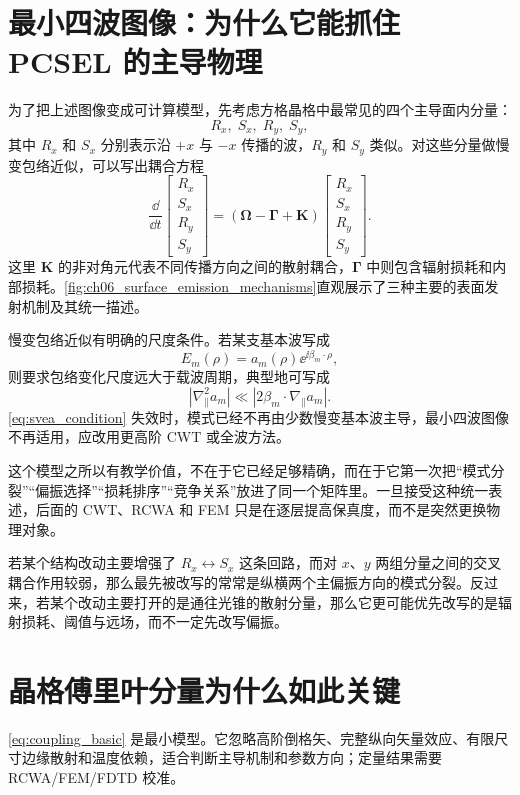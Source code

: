\section{最小四波图像：为什么它能抓住 PCSEL 的主导物理}
为了把上述图像变成可计算模型，先考虑方格晶格中最常见的四个主导面内分量：
\[
R_x,\; S_x,\; R_y,\; S_y,
\]
其中 $R_x$ 和 $S_x$ 分别表示沿 $+x$ 与 $-x$ 传播的波，$R_y$ 和 $S_y$ 类似。对这些分量做慢变包络近似，可以写出耦合方程
\begin{equation}
\frac{\dd}{\dd t}
\begin{bmatrix}
R_x\\S_x\\R_y\\S_y
\end{bmatrix}
=
\left(
\bm{\Omega}
-
\bm{\Gamma}
+
\mathbf{K}
\right)
\begin{bmatrix}
R_x\\S_x\\R_y\\S_y
\end{bmatrix}.
\label{eq:coupling_basic}
\end{equation}
这里 $\mathbf{K}$ 的非对角元代表不同传播方向之间的散射耦合，$\bm{\Gamma}$ 中则包含辐射损耗和内部损耗。\cref{fig:ch06_surface_emission_mechanisms}直观展示了三种主要的表面发射机制及其统一描述。



慢变包络近似有明确的尺度条件。若某支基本波写成
\[
E_m(\rho)=a_m(\rho)\ee^{\ii\beta_m\cdot\rho},
\]
则要求包络变化尺度远大于载波周期，典型地可写成
\begin{equation}
\left|\nabla_\parallel^2 a_m\right|
\ll
\left|2\beta_m\cdot\nabla_\parallel a_m\right|.
\label{eq:svea_condition}
\end{equation}
\cref{eq:svea_condition} 失效时，模式已经不再由少数慢变基本波主导，最小四波图像不再适用，应改用更高阶 CWT 或全波方法。

这个模型之所以有教学价值，不在于它已经足够精确，而在于它第一次把“模式分裂”“偏振选择”“损耗排序”“竞争关系”放进了同一个矩阵里。一旦接受这种统一表述，后面的 CWT、RCWA 和 FEM 只是在逐层提高保真度，而不是突然更换物理对象。

若某个结构改动主要增强了 $R_x \leftrightarrow S_x$ 这条回路，而对 $x$、$y$ 两组分量之间的交叉耦合作用较弱，那么最先被改写的常常是纵横两个主偏振方向的模式分裂。反过来，若某个改动主要打开的是通往光锥的散射分量，那么它更可能优先改写的是辐射损耗、阈值与远场，而不一定先改写偏振。

\section{晶格傅里叶分量为什么如此关键}
\cref{eq:coupling_basic} 是最小模型。它忽略高阶倒格矢、完整纵向矢量效应、有限尺寸边缘散射和温度依赖，适合判断主导机制和参数方向；定量结果需要 RCWA/FEM/FDTD 校准。

